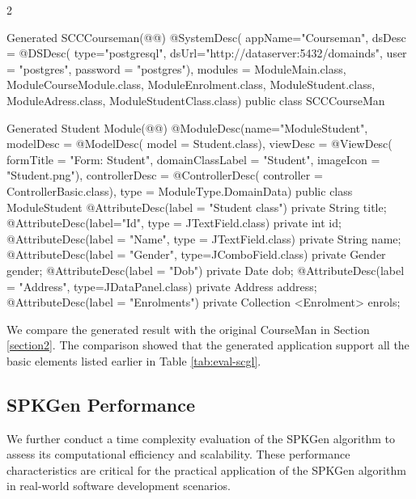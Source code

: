 \documentclass[runningheads]{llncs}
\begin{document}
\begin{multicols}{2}
\begin{lstcodessm}{Generated SCCCourseman}(@@)
@SystemDesc( appName="Courseman",
dsDesc = @DSDesc( type="postgresql",
dsUrl="http://dataserver:5432/domainds",
 user = "postgres", 
 password = "postgres"),
modules = { ModuleMain.class, 
 ModuleCourseModule.class, 
 ModuleEnrolment.class,
 ModuleStudent.class, ModuleAdress.class, 
 ModuleStudentClass.class})
public class SCCCourseMan { }
\end{lstcodessm}


\begin{lstcodessm}{Generated Student Module}(@@)
@ModuleDesc(name="ModuleStudent", 
 modelDesc = @ModelDesc(
        model = Student.class),
 viewDesc = @ViewDesc(
        formTitle = "Form: Student",
        domainClassLabel = "Student",
        imageIcon = "Student.png"), 
 controllerDesc = @ControllerDesc(
   controller = ControllerBasic.class),
   type = ModuleType.DomainData)
public class ModuleStudent { 
@AttributeDesc(label = "Student class") 
private String title; 
@AttributeDesc(label="Id", type = JTextField.class) 
private int id; 
@AttributeDesc(label = "Name", type = JTextField.class) 
private String name; 
@AttributeDesc(label = "Gender", type=JComboField.class) 
private Gender gender; 
@AttributeDesc(label = "Dob") 
private Date dob; 
@AttributeDesc(label = "Address", type=JDataPanel.class) 
private Address address; 
@AttributeDesc(label = "Enrolments") 
private Collection <Enrolment> enrols; }
\end{lstcodessm}
\end{multicols}

We compare the generated result with the original CourseMan in Section \ref{section2}. The comparison showed that the generated application support all the basic elements listed earlier in Table \ref{tab:eval-scgl}.

\subsection{SPKGen Performance}
We further conduct a time complexity evaluation of the SPKGen algorithm to assess its computational efficiency and scalability. These performance characteristics are critical for the practical application of the SPKGen algorithm in real-world software development scenarios. 
\end{document}
